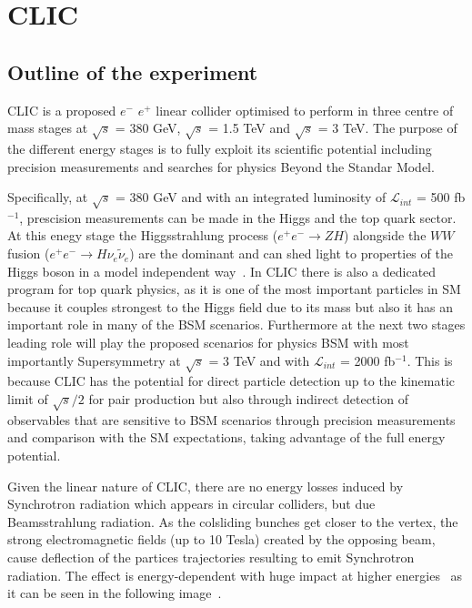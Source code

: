 \documentclass[12pt,a4paper]{report}
\begin{document}
\chapter{CLIC}

\section{Outline of the experiment}

CLIC is a proposed $e^{-}$ $e^{+}$ linear collider optimised to perform in three centre of mass stages at 
$\surd s$ = 380 GeV, $\surd s$ = 1.5 TeV and $\surd s$ = 3 TeV. The purpose of the different energy stages is to 
fully exploit its scientific potential including precision measurements and searches for physics Beyond the 
Standar Model.

Specifically, at $\surd s$ = 380 GeV and with an integrated luminosity of $\mathcal{L}_{int}$ = 500 fb$^{-1}$, 
prescision measurements can be made in the Higgs and the top quark sector. At this enegy stage the Higgsstrahlung
process ($e^{+}e^{-}\rightarrow ZH$) alongside the $WW$ fusion ($e^{+}e^{-}\rightarrow H\nu_{e}\tilde{\nu}_{e}$) 
are the dominant and can shed light to properties of the Higgs boson in a model independent way~\cite{clic2016updated}.
In CLIC there is also a dedicated program for top quark physics, as it is one of the most important particles
in SM because it couples strongest to the Higgs field due to its mass but also it has an important role in 
many of the BSM scenarios.
Furthermore at the next two stages leading role will play the proposed scenarios for physics BSM with most 
importantly Supersymmetry at $\surd s$ = 3 TeV and with $\mathcal{L}_{int}$ = 2000 fb$^{-1}$. This  is because CLIC has the potential for direct particle detection up to the 
kinematic limit of $\surd s /2$ for pair production but also through indirect detection of observables that are sensitive to BSM
scenarios through precision measurements and comparison with the SM expectations, 
taking advantage of the full energy potential.



Given the linear nature of CLIC, there are no energy losses induced by Synchrotron radiation which appears in 
circular colliders, but due Beamsstrahlung radiation. As the colsliding bunches get closer to the 
vertex, the strong electromagnetic fields (up to 10 Tesla) created by the opposing beam, cause deflection
of the partices trajectories resulting to emit Synchrotron radiation. The effect is energy-dependent with huge
impact at higher energies~\cite{bonvicini1989first} as it can be seen in the following 
image~\cite{abramowicz2017higgs}.
\end{document}
